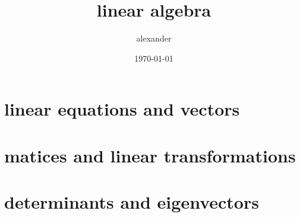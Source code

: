 \documentclass{article}
\title{linear algebra}
\author{alexander}
\date{\today}
\begin{document}
\maketitle


\section{linear equations and vectors}




\section{matices and linear transformations}
\section{determinants and eigenvectors}
\end{document}
